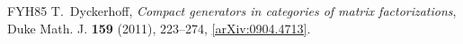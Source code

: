 \documentclass{compositio}
\theoremstyle{definition}
\numberwithin{equation}{section}
\begin{document}
\begin{thebibliography}{FYH{\etalchar{+}}85}
%
%
%
%
%  
T.~Dyckerhoff, \emph{Compact generators in categories of matrix factorizations},
  Duke Math. J. \textbf{159} (2011), 223--274,
  \href{http://arxiv.org/abs/0904.4713}{[arXiv:0904.4713]}.


\end{thebibliography}
\end{document}
